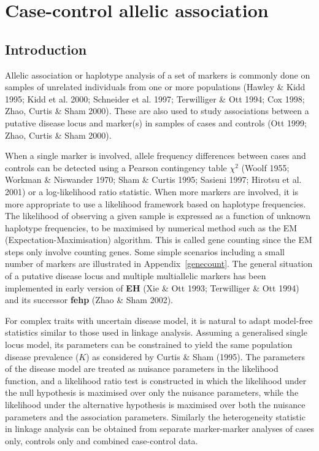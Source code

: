 \chapter{Case-control allelic association}

\section{Introduction}

Allelic association or haplotype analysis of a set of markers is commonly done
on samples of unrelated individuals from one or more populations (Hawley \&
Kidd 1995; Kidd et al.  2000; Schneider et al.  1997; Terwilliger \& Ott 1994;
Cox 1998; Zhao, Curtis \& Sham 2000).  These are also used to study
associations between a putative disease locus and marker(s) in samples of cases
and controls (Ott 1999; Zhao, Curtis \& Sham 2000).

When a single marker is involved, allele frequency differences between cases
and controls can be detected using a Pearson contingency table $\chi^2$ (Woolf
1955; Workman \& Niswander 1970; Sham \& Curtis 1995; Sasieni 1997; Hirotsu et
al.  2001) or a log-likelihood ratio statistic.  When more markers are
involved, it is more appropriate to use a likelihood framework based on
haplotype frequencies.  The likelihood of observing a given sample is expressed
as a function of unknown haplotype frequencies, to be maximised by numerical
method such as the EM (Expectation-Maximisation) algorithm.  This is called
gene counting since the EM steps only involve counting genes.  Some simple
scenarios including a small number of markers are illustrated in
Appendix~\ref{genecount}.  The general situation of a putative disease locus
and multiple multiallelic markers has been implemented in early version of {\bf
EH} (Xie \& Ott 1993; Terwilliger \& Ott 1994) and its successor {\bf fehp}
(Zhao \& Sham 2002).

For complex traits with uncertain disease model, it is natural to adapt
model-free statistics similar to those used in linkage analysis.  Assuming a
generalised single locus model, its parameters can be constrained to yield the
same population disease prevalence ($K$) as considered by Curtis \& Sham
(1995).  The parameters of the disease model are treated as nuisance parameters
in the likelihood function, and a likelihood ratio test is constructed in which
the likelihood under the null hypothesis is maximised over only the nuisance
parameters, while the likelihood under the alternative hypothesis is maximised
over both the nuisance parameters and the association parameters.  Similarly
the heterogeneity statistic in linkage analysis can be obtained from separate
marker-marker analyses of cases only, controls only and combined case-control
data.

